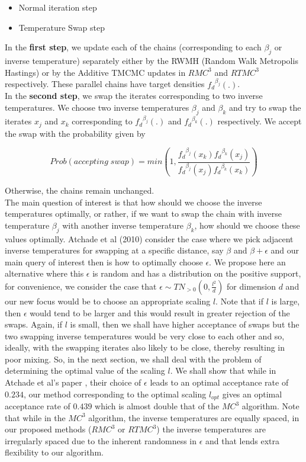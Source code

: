 \documentclass[11pt]{article}
\renewcommand{\b}{\ensuremath{\beta}}
\newcommand{\e}{\ensuremath{\epsilon}}
\begin{document}
\begin{itemize}
\item Normal iteration step
\item Temperature Swap step
\end{itemize}

In the \textbf{first step}, we update each of the chains (corresponding to each $\b_j$ or inverse temperature) separately either by the RWMH (Random Walk Metropolis Hastings) or by the Additive TMCMC updates in $RMC^3$ and $RTMC^3$ respectively. These parallel chains have target densities ${f_{d}}^{\b_j} (.)$. \\

In the \textbf{second step}, we swap the iterates corresponding to two inverse temperatures. We choose two inverse temperatures $\b_j$ and $\b_k$ and try to swap the iterates $x_j$ and $x_k$ corresponding to ${f_{d}}^{\b_j} (.)$ and ${f_{d}}^{\b_k} (.)$ respectively. We accept the swap with the probability given by 

\newcommand{\fjxj}{{f_d}^{\beta_{j}}(x_j)}
\newcommand{\fjxk}{{f_d}^{\beta_{j}}(x_k)}
\newcommand{\fkxj}{{f_d}^{\beta_{k}}(x_j)}
\newcommand{\fkxk}{{f_d}^{\beta_{k}}(x_k)}

\[ Prob(accepting \; swap)= min \left (1, \frac{\fjxk \fkxj}{\fjxj \fkxk} \right ) \]

Otherwise, the chains remain unchanged. \\

The main question of interest is that how should we choose the inverse temperatures optimally, or rather, if we want to swap the chain with inverse temperature $\b_j$ with another inverse temperature $\b_k$, how should we choose these values optimally. Atchade et al (2010) \cite{Atchade2010} consider the case where we pick adjacent inverse temperatures for swapping at a specific distance, say $\b$ and $\b+\e$ and our main query of interest then is how to optimally choose $\e$. We propose here an alternative where this $\e$ is random and has a distribution on the positive support, for convenience, we consider the case that $\e \sim TN_{>0}(0, \frac{l^2}{d})$ for dimension $d$ and our new focus would be to choose an appropriate scaling $l$. Note that if $l$ is large, then $\e$ would tend to be larger and this would result in greater rejection of the swaps. Again, if $l$ is small, then we shall have higher acceptance of swaps but the two swapping inverse temperatures would be very close to each other and so, ideally, with the swapping iterates also likely to be close, thereby resulting in poor mixing.  So, in the next section, we shall deal with the problem of determining the optimal value of the scaling $l$. We shall show that while in Atchade et al's paper \cite{Atchade2010}, their choice of $\e$ leads to an optimal acceptance rate of $0.234$, our method corresponding to the optimal scaling $l_{opt}$ gives an optimal acceptance rate of $0.439$ which is almost double that of the $MC^3$ algorithm. Note that while in the $MC^3$ algorithm, the inverse temperatures are equally spaced, in our proposed methods ($RMC^3$ or $RTMC^3$) the inverse temperatures are irregularly spaced due to the inherent randomness in $\e$ and that lends extra flexibility to our algorithm. 
\end{document}
